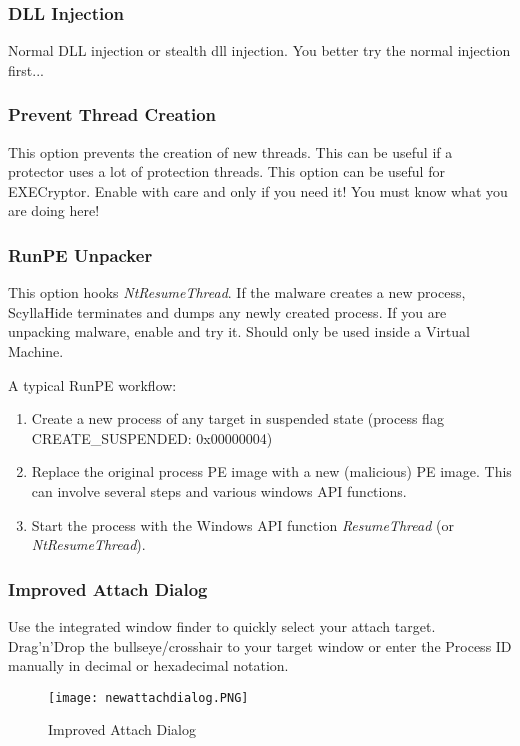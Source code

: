\documentclass[10pt,a4paper]{article}
\begin{document}
\subsubsection{DLL Injection}
Normal DLL injection or stealth dll injection. You better try the normal injection first...

\pagebreak

\subsubsection{Prevent Thread Creation}
This option prevents the creation of new threads. This can be useful if a protector uses a lot of protection threads. This option can be useful for EXECryptor. Enable with care and only if you need it! You must know what you are doing here!

\subsubsection{RunPE Unpacker}
This option hooks \textit{NtResumeThread}. If the malware creates a new process, ScyllaHide terminates and dumps any newly created process. If you are unpacking malware, enable and try it. Should only be used inside a Virtual Machine.

A typical RunPE workflow:

\begin{enumerate}
\item Create a new process of any target in suspended state (process flag CREATE\_SUSPENDED: 0x00000004)
\item Replace the original process PE image with a new (malicious) PE image. This can involve several steps and various windows API functions.
\item Start the process with the Windows API function \textit{ResumeThread} (or \textit{NtResumeThread}).
\end{enumerate}

\subsubsection{Improved Attach Dialog}
Use the integrated window finder to quickly select your attach target. Drag'n'Drop the bullseye/crosshair to your target window or enter the Process ID manually in decimal or hexadecimal notation.
\begin{figure}[H]
\centering
\texttt{[image: newattachdialog.PNG]}
\caption{Improved Attach Dialog}
\end{figure}
\end{document}
